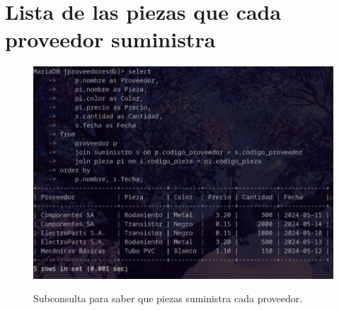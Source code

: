 \documentclass{article}
\begin{document}
\newpage %



\newpage %

\section*{Lista  de las piezas que cada proveedor suministra}

\begin{figure}[ht]
    \centering
    {
        \includegraphics[width=\linewidth]{01screenshot.png} %
    }
    \caption{Subconsulta para saber que piezas suministra cada proveedor.}
\end{figure}
\end{document}
